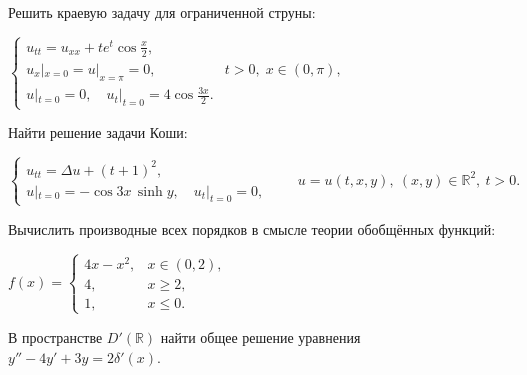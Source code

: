 
\begin{cond}
\end{cond}

\begin{cond}
\end{cond}

\begin{cond}
	Решить краевую задачу для ограниченной струны:

	\(
	\begin{cases}
		u_{tt} = u_{xx} + t e^{t}\cos\!\frac{x}{2},            \\
		u_x|_{x=0} = u|_{x=\pi} = 0, & t > 0,\; x \in (0,\pi), \\
		u|_{t=0} = 0,\quad u_t|_{t=0} = 4\cos\!\frac{3x}{2}.
	\end{cases}
	\)
\end{cond}

\begin{cond}
	Найти решение задачи Коши:

	\(
	\begin{cases}
		u_{tt} = \Delta u + (t+1)^2, \\
		u|_{t=0} = -\cos 3x\,\sinh y,\quad u_t|_{t=0} = 0,
	\end{cases}
	\qquad
	u = u(t,x,y),\ (x,y)\in\mathbb{R}^2,\ t>0.
	\)
\end{cond}

\begin{cond}
	Вычислить производные всех порядков в смысле теории обобщённых функций:

	\(
	f(x) =
	\begin{cases}
		4x - x^2, & x \in (0,2), \\
		4,        & x \ge 2,     \\
		1,        & x \le 0.
	\end{cases}
	\)
\end{cond}

\begin{cond}
	В пространстве \(D'(\mathbb{R})\) найти общее решение уравнения
	$y'' - 4y' + 3y = 2\delta'(x)$.
\end{cond}
